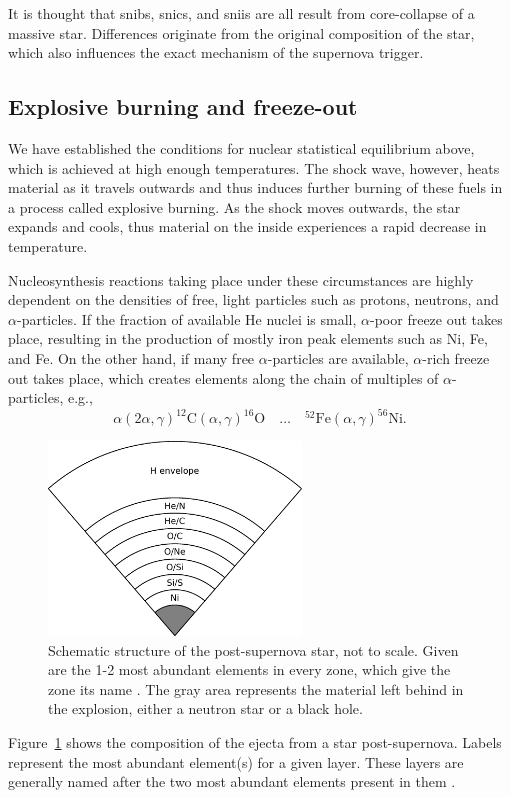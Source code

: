 It is thought that \acp{snib}, \acp{snic}, and \acp{snii} are all result from core-collapse of a massive star. Differences originate from the original composition of the star, which also influences the exact mechanism of the supernova trigger.

\subsection{Explosive burning and freeze-out}

We have established the conditions for nuclear statistical equilibrium above, which is achieved at high enough temperatures. The shock wave, however, heats material as it travels outwards and thus induces further burning of these fuels in a process called explosive burning. As the shock moves outwards, the star expands and cools, thus material on the inside experiences a rapid decrease in temperature. 

Nucleosynthesis reactions taking place under these circumstances are highly dependent on the densities of free, light particles such as protons, neutrons, and $\alpha$-particles. If the fraction of available He nuclei is small, $\alpha$-poor freeze out takes place, resulting in the production of mostly iron peak elements such as Ni, Fe, and Fe. On the other hand, if many free $\alpha$-particles are available, $\alpha$-rich freeze out takes place, which creates elements along the chain of multiples of $\alpha$-particles, e.g., 
\begin{equation}
    \alpha (2\alpha, \gamma) ^{12}\mathrm{C} (\alpha, \gamma) ^{16}\mathrm{O} \quad \dots \quad ^{52}\mathrm{Fe} (\alpha, \gamma) ^{56}\mathrm{Ni}.
\end{equation}

\begin{figure}[tb]
    \centering
    \includegraphics[width=0.6\textwidth]{graphics/massive_stars/post-supernova}
    \caption{Schematic structure of the post-supernova star, not to scale. Given are the 1-2 most abundant elements in every zone, which give the zone its name \citep{meyer95}. The gray area represents the material left behind in the explosion, either a neutron star or a black hole.}
    \label{fig:massive_stars:post-supernova_structure_schematic}
\end{figure}
Figure~\ref{fig:massive_stars:post-supernova_structure_schematic} shows the composition of the ejecta from a star post-supernova. Labels represent the most abundant element(s) for a given layer. These layers are generally named after the two most abundant elements present in them \citep{meyer95}.

